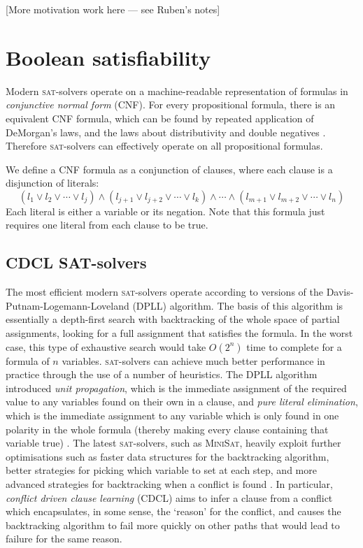 \documentclass[proof,pdftex,11pt,a4]{article}
\newcommand{\sat}{\textsc{sat}}
\begin{document}
[More motivation work here --- see Ruben's notes]

\section{Boolean satisfiability}

Modern \sat{}-solvers operate on a machine-readable representation of formulas in \emph{conjunctive normal form} (CNF). For every propositional formula, there is an equivalent CNF formula, which can be found by repeated application of DeMorgan's laws, and the laws about distributivity and double negatives \cite{Plaisted:1986}. Therefore \sat{}-solvers can effectively operate on all propositional formulas.

We define a CNF formula as a conjunction of clauses, where each clause is a disjunction of literals:
\[(l_1 \vee l_2 \vee \cdots \vee l_j) \wedge (l_{j+1} \vee l_{j+2} \vee \cdots \vee l_k) \wedge \cdots \wedge (l_{m+1} \vee l_{m+2} \vee \cdots \vee l_n)\]
Each literal is either a variable or its negation. Note that this formula just requires one literal from each clause to be true.

\subsection{CDCL SAT-solvers}

The most efficient modern \sat{}-solvers operate according to versions of the Davis-Putnam-Logemann-Loveland (DPLL) algorithm. The basis of this algorithm is essentially a depth-first search with backtracking of the whole space of partial assignments, looking for a full assignment that satisfies the formula. In the worst case, this type of exhaustive search would take $O(2^n)$ time to complete for a formula of $n$ variables. \sat{}-solvers can achieve much better performance in practice through the use of a number of heuristics. The DPLL algorithm introduced \emph{unit propagation}, which is the immediate assignment of the required value to any variables found on their own in a clause, and \emph{pure literal elimination}, which is the immediate assignment to any variable which is only found in one polarity in the whole formula (thereby making every clause containing that variable true) \cite{Davis:1962}. The latest \sat{}-solvers, such as \textsc{MiniSat}, heavily exploit further optimisations such as faster data structures for the backtracking algorithm, better strategies for picking which variable to set at each step, and more advanced strategies for backtracking when a conflict is found \cite{Een:2003}. In particular, \emph{conflict driven clause learning} (CDCL) aims to infer a clause from a conflict which encapsulates, in some sense, the `reason' for the conflict, and causes the backtracking algorithm to fail more quickly on other paths that would lead to failure for the same reason.
\end{document}

